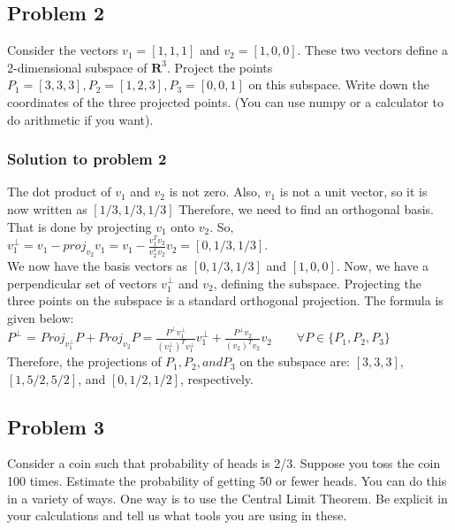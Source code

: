 \documentclass[12pt]{article}%
\begin{document}

\subsection{Problem 2}

Consider the vectors $v_1 = [1, 1, 1]$ and $v_2 = [1, 0, 0]$. These two vectors define a 2-dimensional subspace of $\mathbf{R}^3$. Project the points $P_1 = [3, 3, 3], P_2 = [1, 2, 3], P_3 = [0, 0, 1]$ on this subspace. Write down the coordinates of the three projected points. (You can use numpy or a calculator to do arithmetic if you want).

\subsubsection{Solution to problem 2}
The dot product of $v_1$ and $v_2$ is not zero. Also, $v_1$ is not a unit vector, so it is now written as $[1/3, 1/3, 1/3]$ Therefore, we need to find an orthogonal basis. That is done by projecting $v_1$ onto $v_2$. So, $v_1^\perp = v_1 - proj_{v_2}v_1 = v_1 - \frac{v_1^T v_2}{v_2^T v_2}v_2 = [0, 1/3, 1/3]$.\\ 

We now have the basis vectors as $[0, 1/3, 1/3]$ and $[1, 0, 0]$. Now, we have a perpendicular set of vectors $v_1^\perp$ and $v_2$, defining the subspace. Projecting the three points on the subspace is a standard orthogonal projection. The formula is given below:\\
$P^\perp$ = $Proj_{v_1^\perp} P + Proj_{v_2} P = \frac{P^\perp v_1^\perp}{(v_1^\perp)^T v_1^\perp} v_1^\perp + \frac{P^\perp v_2}{(v_2)^T v_2} v_2 \qquad \forall P \in \{P_1, P_2, P_3\}$\\

Therefore, the projections of $P_1, P_2, and P_3$ on the subspace are: $[3, 3, 3]$, $[1, 5/2, 5/2]$, and $[0, 1/2, 1/2]$, respectively.


\subsection{Problem 3}

Consider a coin such that probability of heads is 2/3. Suppose you toss the coin 100 times. Estimate the probability of getting 50 or fewer heads. You can do this in a variety of ways. One way is to use the Central Limit Theorem. Be explicit in your calculations and tell us what tools you are using in these.
\end{document}
